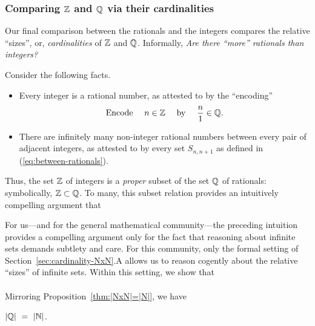 \subsubsection{Comparing $\mathbb{Z}$ and $\Q$ via their cardinalities}
\label{sec:Q-Z-cardinality}

Our final comparison between the rationals and the integers compares
the relative ``sizes'', or, {\em cardinalities} of $\mathbb{Z}$ and $\Q$.
Informally, {\it Are there ``more'' rationals than integers?}
\medskip

\noindent Consider the following facts.
\begin{itemize}
\item
Every integer is a rational number, as attested to by the ``encoding''
\begin{equation}
\label{eq:ZintoQ}
\mbox{Encode } \ \ \ n \in \mathbb{Z} \ \ \ \mbox{ by } \ \ \ {n \over 1} \in \mathbb{Q} .
\end{equation}

\item
There are infinitely many non-integer rational numbers between every
pair of adjacent integers, as attested to by every set $S_{n,n+1}$ as
defined in (\ref{eq:between-rationals}).
\end{itemize}
Thus, the set $\mathbb{Z}$ of integers is a {\em proper} subset of the set
$\Q$ of rationals: symbolically, $\mathbb{Z} \subset \mathbb{Q}$.  To many, this
subset relation provides an intuitively compelling argument that \\
\hspace*{.35in}{\em there are more rational numbers than integers.}

For us---and for the general mathematical community---the preceding
intuition provides a compelling argument only for the fact that
reasoning about infinite sets demands subtlety and care.  For this
community, only the formal setting of
Section~\ref{sec:cardinality-NxN}.A allows us to reason cogently about
the relative ``sizes'' of infinite sets.  Within this setting, we show
that \\
\hspace*{.35in}{\em the set $\N$ has the same cardinality as the set $\Q$.}  \\
Mirroring Proposition~\ref{thm:|NxN|=|N|}, we have

\begin{prop}
\label{thm:|Q|=|N|}
$|\mathbb{Q}| \ = \ |\mathbb{N}|$.
\end{prop}

